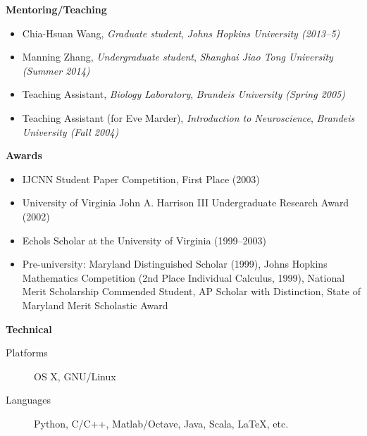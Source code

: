 \documentclass[10pt]{article}
\begin{document}
{\large \textbf{Mentoring/Teaching}}
\begin{itemize}
  \item Chia-Hsuan Wang, \emph{Graduate student}, \emph{Johns Hopkins University (2013--5)}
  \item Manning Zhang, \emph{Undergraduate student}, \emph{Shanghai Jiao Tong University (Summer 2014)}
  \item Teaching Assistant, \emph{Biology Laboratory}, \emph{Brandeis University (Spring 2005)}
  \item Teaching Assistant (for Eve Marder), \emph{Introduction to Neuroscience}, \emph{Brandeis University (Fall 2004)}
\end{itemize}


{\large \textbf{Awards}}
\begin{itemize}
  \item IJCNN Student Paper Competition, First Place (2003)
  \item University of Virginia John A. Harrison III Undergraduate Research Award (2002)
  \item Echols Scholar at the University of Virginia (1999--2003) 
  \item Pre-university: Maryland Distinguished Scholar (1999), Johns Hopkins Mathematics Competition (2nd Place Individual Calculus, 1999), National Merit Scholarship Commended Student, AP Scholar with Distinction, State of Maryland Merit Scholastic Award
\end{itemize}

{\large \textbf{Technical}}
\begin{description}
    \item[\quad Platforms] OS X, GNU/Linux
    \item[\quad Languages] Python, C/C++, Matlab/Octave, Java, Scala, \LaTeX, etc.
\end{description}
\end{document}
